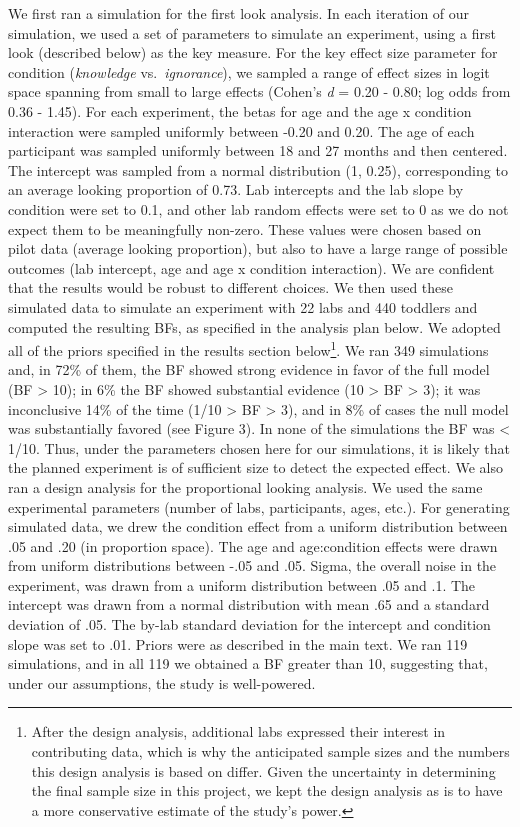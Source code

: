 \documentclass[
  english,
  man,floatsintext]{apa6}
\begin{document}
We first ran a simulation for the first look analysis. In each iteration of our simulation, we used a set of parameters to simulate an experiment, using a first look (described below) as the key measure. For the key effect size parameter for condition (\emph{knowledge} vs.~\emph{ignorance}), we sampled a range of effect sizes in logit space spanning from small to large effects (Cohen's \emph{d} = 0.20 - 0.80; log odds from 0.36 - 1.45). For each experiment, the betas for age and the age x condition interaction were sampled uniformly between -0.20 and 0.20. The age of each participant was sampled uniformly between 18 and 27 months and then centered. The intercept was sampled from a normal distribution (1, 0.25), corresponding to an average looking proportion of 0.73. Lab intercepts and the lab slope by condition were set to 0.1, and other lab random effects were set to 0 as we do not expect them to be meaningfully non-zero. These values were chosen based on pilot data (average looking proportion), but also to have a large range of possible outcomes (lab intercept, age and age x condition interaction). We are confident that the results would be robust to different choices. We then used these simulated data to simulate an experiment with 22 labs and 440 toddlers and computed the resulting BFs, as specified in the analysis plan below. We adopted all of the priors specified in the results section below\footnote{After the design analysis, additional labs expressed their interest in contributing data, which is why the anticipated sample sizes and the numbers this design analysis is based on differ. Given the uncertainty in determining the final sample size in this project, we kept the design analysis as is to have a more conservative estimate of the study's power.}. We ran 349 simulations and, in 72\% of them, the BF showed strong evidence in favor of the full model (BF \textgreater{} 10); in 6\% the BF showed substantial evidence (10 \textgreater{} BF \textgreater{} 3); it was inconclusive 14\% of the time (1/10 \textgreater{} BF \textgreater{} 3), and in 8\% of cases the null model was substantially favored (see Figure 3). In none of the simulations the BF was \textless{} 1/10. Thus, under the parameters chosen here for our simulations, it is likely that the planned experiment is of sufficient size to detect the expected effect.
We also ran a design analysis for the proportional looking analysis. We used the same experimental parameters (number of labs, participants, ages, etc.). For generating simulated data, we drew the condition effect from a uniform distribution between .05 and .20 (in proportion space). The age and age:condition effects were drawn from uniform distributions between -.05 and .05. Sigma, the overall noise in the experiment, was drawn from a uniform distribution between .05 and .1. The intercept was drawn from a normal distribution with mean .65 and a standard deviation of .05. The by-lab standard deviation for the intercept and condition slope was set to .01. Priors were as described in the main text. We ran 119 simulations, and in all 119 we obtained a BF greater than 10, suggesting that, under our assumptions, the study is well-powered.
\end{document}
